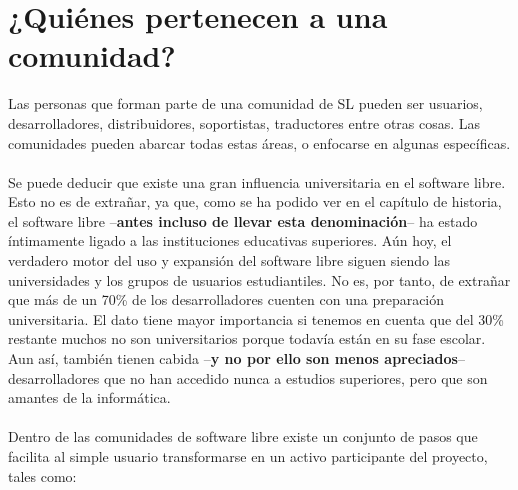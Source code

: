 \section{¿Quiénes pertenecen a una comunidad?}


Las personas que forman parte de una comunidad de SL pueden ser usuarios, desarrolladores, distribuidores, soportistas, traductores entre otras cosas. Las comunidades pueden abarcar todas estas áreas, o enfocarse en algunas específicas.
\\
\\
Se puede deducir que existe una gran influencia universitaria en el software libre. Esto no es de extrañar, ya que, como se ha podido ver en el capítulo de historia, el software libre –{\bf antes incluso de llevar esta denominación}– ha estado íntimamente ligado a las instituciones educativas superiores. Aún hoy, el verdadero motor del uso y expansión del software libre siguen siendo las universidades y los grupos de usuarios estudiantiles. No es, por tanto, de extrañar que más de un 70\% de los desarrolladores cuenten con una preparación universitaria. El dato tiene mayor importancia si tenemos en cuenta que del 30\% restante muchos no son universitarios porque todavía están en su fase escolar. Aun así, también tienen cabida –{\bf y no por ello son menos apreciados}– desarrolladores que no han accedido nunca a estudios superiores, pero que son amantes de la informática.
\\
\\
Dentro de las comunidades de software libre existe un conjunto de pasos que facilita al simple usuario transformarse en un activo participante del proyecto, tales como: 

